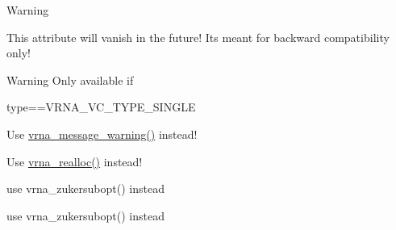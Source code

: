 \begin{DoxyRefList}
\begin{DoxyWarning}{Warning}
\end{DoxyWarning}

\item[\label{deprecated__deprecated000047}%
\hypertarget{deprecated__deprecated000047}{}%
Global \hyperlink{group__fold__compound_a7fe1235ce3d41287695f1ae1e283e8fc}{vrna\+\_\+fc\+\_\+s\+:\+:ptype\+\_\+pf\+\_\+compat} ]This attribute will vanish in the future! It\textquotesingle{}s meant for backward compatibility only! \begin{DoxyWarning}{Warning}
Only available if\begin{DoxyVerb}type==VRNA_VC_TYPE_SINGLE \end{DoxyVerb}
  
\end{DoxyWarning}

\item[\label{deprecated__deprecated000148}%
\hypertarget{deprecated__deprecated000148}{}%
global\+Scope$>$ Global \hyperlink{utils_8h_af2355fa8746f2f30fbe71db65dea3d51}{warn\+\_\+user} (const char message\mbox{[}\mbox{]})]Use \hyperlink{group__utils_gafe4072406bd287c6857763dd7d2fe1f1}{vrna\+\_\+message\+\_\+warning()} instead!  
\item[\label{deprecated__deprecated000151}%
\hypertarget{deprecated__deprecated000151}{}%
global\+Scope$>$ Global \hyperlink{utils_8h_a9037ada838835b1b9db41581a021b0c8}{xrealloc} (void $\ast$p, unsigned size)]Use \hyperlink{group__utils_ga27f4719a66c6f90d1cca3d1e6e696c6a}{vrna\+\_\+realloc()} instead!  
\item[\label{deprecated__deprecated000144}%
\hypertarget{deprecated__deprecated000144}{}%
global\+Scope$>$ Global \hyperlink{group__subopt__zuker_ga0d5104e3ecf119d8eabd40aa5fe47f90}{zukersubopt} (const char $\ast$string)]use vrna\+\_\+zukersubopt() instead 
\item[\label{deprecated__deprecated000145}%
\hypertarget{deprecated__deprecated000145}{}%
global\+Scope$>$ Global \hyperlink{group__subopt__zuker_gab6d0ea8cc1d02f6dd831ca81043c9eb8}{zukersubopt\+\_\+par} (const char $\ast$string, vrna\+\_\+param\+\_\+t $\ast$parameters)]use vrna\+\_\+zukersubopt() instead
\end{DoxyRefList}
